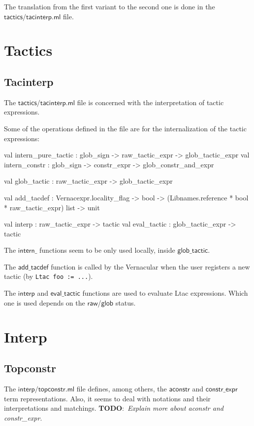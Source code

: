 \documentclass[a4paper,oneside]{book}
\newcommand{\m}[1]{\ensuremath{\mathsf{#1}}}
\newcommand{\TODO}[1]{\textbf{TODO}:\ \emph{#1}}
\begin{document}
The translation from the first variant to the second one is done in
the \m{tactics/tacinterp.ml} file.

\newpage

\section{Tactics}

\subsection{Tacinterp}

The \m{tactics/tacinterp.ml} file is concerned with the interpretation
of tactic expressions.

Some of the operations defined in the file are for the internalization
of the tactic expressions:

\begin{code}
val intern_pure_tactic : glob_sign -> raw_tactic_expr -> glob_tactic_expr
val intern_constr : glob_sign -> constr_expr -> glob_constr_and_expr

val glob_tactic : raw_tactic_expr -> glob_tactic_expr

val add_tacdef :
  Vernacexpr.locality_flag -> bool ->
  (Libnames.reference * bool * raw_tactic_expr) list -> unit

val interp : raw_tactic_expr -> tactic
val eval_tactic : glob_tactic_expr -> tactic
\end{code}

\noindent
The \m{intern\_} functions seem to be only used locally, inside
\m{glob\_tactic}.

The \m{add\_tacdef} function is called by the Vernacular when the user
registers a new tactic (by \verb|Ltac foo := ...|).

The \m{interp} and \m{eval\_tactic} functions are used to evaluate
Ltac expressions. Which one is used depends on the \m{raw}/\m{glob}
status.

\newpage

\section{Interp}

\subsection{Topconstr}

The \m{interp/topconstr.ml} file defines, among others, the
\m{aconstr} and \m{constr\_expr} term representations. Also, it seems
to deal with notations and their interpretations and
matchings. \TODO{Explain more about aconstr and constr\_expr}.
\end{document}

